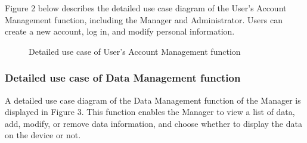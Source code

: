 \documentclass[../Main.tex]{subfiles}
\begin{document}
Figure 2 below describes the detailed use case diagram of the User's Account Management function, including the Manager and Administrator. Users can create a new account, log in, and modify personal information.

\begin{figure}[htbp]
  \centering
{}
\caption{Detailed use case of User's Account Management function}
\label{fig:usecasediagram}
\end{figure}

\subsubsection{Detailed use case of Data Management function}
A detailed use case diagram of the Data Management function of the Manager is displayed in Figure 3. This function enables the Manager to view a list of data, add, modify, or remove data information, and choose whether to display the data on the device or not.
\end{document}
